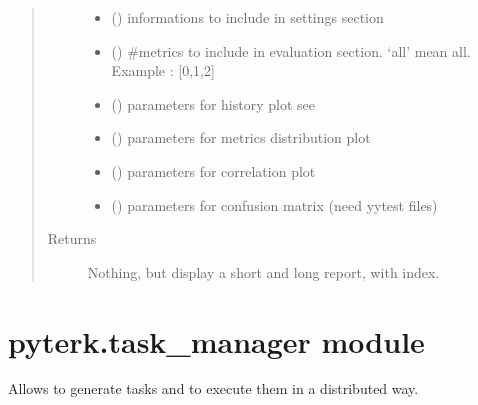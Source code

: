 \documentclass[letterpaper,10pt,english]{sphinxmanual}
\begin{document}
\begin{fulllineitems}
\begin{quote}
\begin{description}
\begin{itemize}
\item {} 
\sphinxAtStartPar
{} () \textendash{} informations to include in settings section

\item {} 
\sphinxAtStartPar
{} () \textendash{} \#metrics to include in evaluation section. ‘all’ mean all. Example : {[}0,1,2{]}

\item {} 
\sphinxAtStartPar
{} () \textendash{} parameters for history plot \sphinxhyphen{} see 

\item {} 
\sphinxAtStartPar
{} () \textendash{} parameters for metrics distribution plot

\item {} 
\sphinxAtStartPar
{} () \textendash{} parameters for correlation plot

\item {} 
\sphinxAtStartPar
{} () \textendash{} parameters for confusion matrix (need yytest files)

\end{itemize}

\item[{Returns}] \leavevmode
\sphinxAtStartPar
Nothing, but display a short and long report, with index.

\end{description}\end{quote}

\end{fulllineitems}



\section{pyterk.task\_manager module}
\label{\detokenize{PyTerK:module-pyterk.task_manager}}\label{\detokenize{PyTerK:pyterk-task-manager-module}}
\sphinxAtStartPar
Allows to generate tasks and to execute them in a distributed way.
\end{document}
